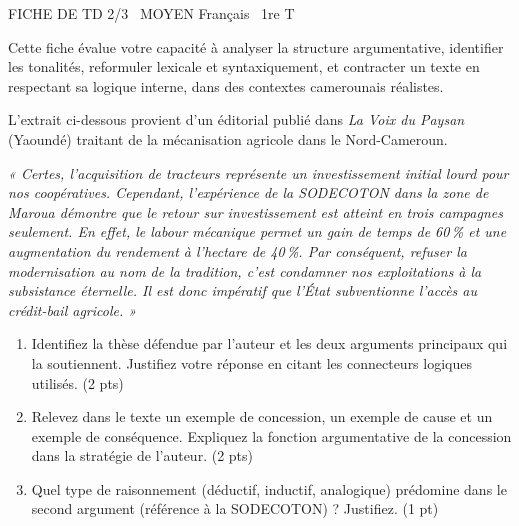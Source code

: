 \documentclass[11pt]{article}
\begin{document}
\begin{tcolorbox}[enhanced,colback=popink,colframe=popink,arc=10pt,boxrule=0pt,left=12pt,right=12pt,top=9pt,bottom=9pt]
{\color{white}\popxbold\small FICHE DE TD 2/3 \textbullet\ MOYEN \hfill Français \textbullet\ 1re T\par}
\end{tcolorbox}
\vspace{4pt}

\noindent Cette fiche évalue votre capacité à analyser la structure argumentative, identifier les tonalités, reformuler lexicale et syntaxiquement, et contracter un texte en respectant sa logique interne, dans des contextes camerounais réalistes.

\begin{exercice}
L'extrait ci-dessous provient d'un éditorial publié dans \textit{La Voix du Paysan} (Yaoundé) traitant de la mécanisation agricole dans le Nord-Cameroun.

\textit{« Certes, l'acquisition de tracteurs représente un investissement initial lourd pour nos coopératives. Cependant, l'expérience de la SODECOTON dans la zone de Maroua démontre que le retour sur investissement est atteint en trois campagnes seulement. En effet, le labour mécanique permet un gain de temps de 60\,\% et une augmentation du rendement à l'hectare de 40\,\%. Par conséquent, refuser la modernisation au nom de la tradition, c'est condamner nos exploitations à la subsistance éternelle. Il est donc impératif que l'État subventionne l'accès au crédit-bail agricole. »}

\begin{enumerate}
    \item Identifiez la thèse défendue par l'auteur et les deux arguments principaux qui la soutiennent. Justifiez votre réponse en citant les connecteurs logiques utilisés. (2 pts)
    \item Relevez dans le texte un exemple de concession, un exemple de cause et un exemple de conséquence. Expliquez la fonction argumentative de la concession dans la stratégie de l'auteur. (2 pts)
    \item Quel type de raisonnement (déductif, inductif, analogique) prédomine dans le second argument (référence à la SODECOTON) ? Justifiez. (1 pt)
\end{enumerate}
\end{exercice}
\end{document}
